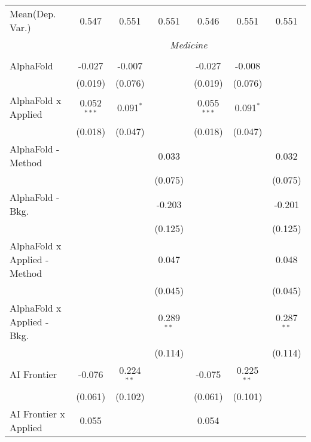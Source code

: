 \begin{tabular}{lcccccc}
Mean(Dep. Var.) & 0.547 & 0.551 & 0.551 & 0.546 & 0.551 & 0.551 \\
 & \multicolumn{6}{c}{\textit{Medicine}} \\ \\
   AlphaFold                    & -0.027        & -0.007       &              & -0.027        & -0.008       &   \\   
                                & (0.019)       & (0.076)      &              & (0.019)       & (0.076)      &   \\   
   AlphaFold x Applied          & 0.052$^{***}$ & 0.091$^{*}$  &              & 0.055$^{***}$ & 0.091$^{*}$  &   \\   
                                & (0.018)       & (0.047)      &              & (0.018)       & (0.047)      &   \\   
   AlphaFold - Method           &               &              & 0.033        &               &              & 0.032\\   
                                &               &              & (0.075)      &               &              & (0.075)\\   
   AlphaFold - Bkg.             &               &              & -0.203       &               &              & -0.201\\   
                                &               &              & (0.125)      &               &              & (0.125)\\   
   AlphaFold x Applied - Method &               &              & 0.047        &               &              & 0.048\\   
                                &               &              & (0.045)      &               &              & (0.045)\\   
   AlphaFold x Applied - Bkg.   &               &              & 0.289$^{**}$ &               &              & 0.287$^{**}$\\   
                                &               &              & (0.114)      &               &              & (0.114)\\   
   AI Frontier                  & -0.076        & 0.224$^{**}$ &              & -0.075        & 0.225$^{**}$ &   \\   
                                & (0.061)       & (0.102)      &              & (0.061)       & (0.101)      &   \\   
   AI Frontier x Applied        & 0.055         &              &              & 0.054         &              &   \\   

\end{tabular}
